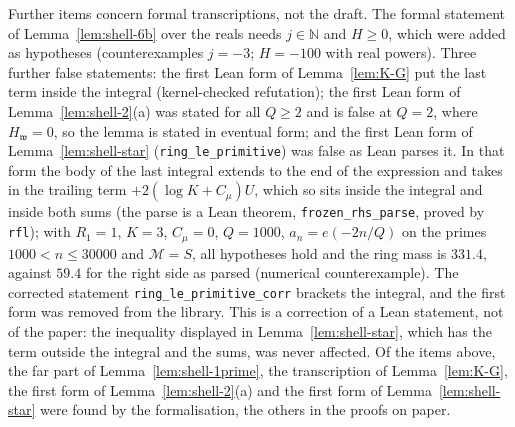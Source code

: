 Further items concern formal transcriptions, not the draft. The formal statement of Lemma~\ref{lem:shell-6b} over the reals needs $j\in\mathbb N$
and $H\ge0$, which were added as hypotheses (counterexamples $j=-3$; $H=-100$ with real powers). Three further false statements: the first Lean form
of Lemma~\ref{lem:K-G} put the last term inside the integral (kernel-checked refutation); the first Lean form of Lemma~\ref{lem:shell-2}(a) was
stated for all $Q\ge2$ and is false at $Q=2$, where $H_{\mathfrak w}=0$, so the lemma is stated in eventual form; and the first Lean form of
Lemma~\ref{lem:shell-star} (\texttt{ring\_le\_primitive}) was false as Lean parses it. In that form the body of the last integral
extends to the end of the expression and takes in the trailing term $+2(\log K+C_\mu)U$, which so sits inside the integral and inside both sums (the
parse is a Lean theorem, \texttt{frozen\_rhs\_parse}, proved by \texttt{rfl}); with $R_1=1$, $K=3$, $C_\mu=0$, $Q=1000$, $a_n=e(-2n/Q)$ on the primes
$1000<n\le30000$ and $\mathcal M=S$, all hypotheses hold and the ring mass is $331.4$, against $59.4$ for the right side as parsed (numerical
counterexample). The corrected statement \texttt{ring\_le\_primitive\_corr} brackets the integral, and the first form was removed from the library.
This is a correction of a Lean statement, not of the paper: the inequality displayed in Lemma~\ref{lem:shell-star}, which has the term outside the
integral and the sums, was never affected. Of the items above, the far part of Lemma~\ref{lem:shell-1prime}, the transcription of
Lemma~\ref{lem:K-G}, the first form of Lemma~\ref{lem:shell-2}(a) and the first form of Lemma~\ref{lem:shell-star} were found by the formalisation,
the others in the proofs on paper.

